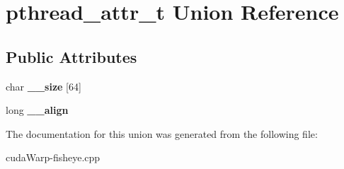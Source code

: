 \hypertarget{unionpthread__attr__t}{}\section{pthread\+\_\+attr\+\_\+t Union Reference}
\label{unionpthread__attr__t}
\subsection*{Public Attributes}
\begin{DoxyCompactItemize}
\item 
char {\bfseries \+\_\+\+\_\+size} \mbox{[}64\mbox{]}\hypertarget{unionpthread__attr__t_a0db0eddc108628276f56e84a8c332a47}{}\label{unionpthread__attr__t_a0db0eddc108628276f56e84a8c332a47}

\item 
long {\bfseries \+\_\+\+\_\+align}\hypertarget{unionpthread__attr__t_a2a26979b8b428e6254dac4eebc082452}{}\label{unionpthread__attr__t_a2a26979b8b428e6254dac4eebc082452}

\end{DoxyCompactItemize}


The documentation for this union was generated from the following file\+:\begin{DoxyCompactItemize}
\item 
cuda\+Warp-\/fisheye.\+cpp\end{DoxyCompactItemize}
